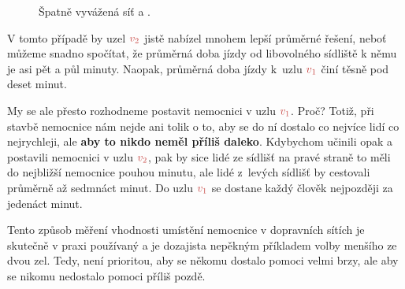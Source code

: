 \begin{figure}[h]
\centering
 \caption{Špatně vyvážená síť  a .}
 \label{fig:spatne-vyvazena-sit}
\end{figure}

V tomto případě by uzel $\clr{v_2}$ jistě nabízel mnohem lepší průměrné řešení,
neboť můžeme snadno spočítat, že průměrná doba jízdy od libovolného sídliště k
němu je asi pět a půl minuty. Naopak, průměrná doba jízdy k~uzlu $\clr{v_1}$
činí těsně pod deset minut.

My se ale přesto rozhodneme postavit nemocnici v uzlu $\clr{v_1}$. Proč? Totiž,
při stavbě nemocnice nám nejde ani tolik o to, aby se do ní dostalo co nejvíce
lidí co nejrychleji, ale \textbf{aby to nikdo neměl příliš daleko}. Kdybychom
učinili opak a postavili nemocnici v uzlu $\clr{v_2}$, pak by sice lidé ze
sídlišť na pravé straně to měli do nejbližší nemocnice pouhou minutu, ale lidé
z~levých sídlišť by cestovali průměrně až sedmnáct minut. Do uzlu $\clr{v_1}$ se
dostane každý člověk nejpozději za jedenáct minut.

Tento způsob měření vhodnosti umístění nemocnice v dopravních sítích je skutečně
v praxi používaný a je dozajista nepěkným příkladem volby menšího ze dvou zel.
Tedy, není prioritou, aby se někomu dostalo pomoci velmi brzy, ale aby se nikomu
nedostalo pomoci příliš pozdě.

